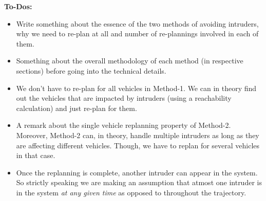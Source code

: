 

\textbf{To-Dos:}
\begin{itemize}
\item Write something about the essence of the two methods of avoiding intruders, why we need to re-plan at all and number of re-plannings involved in each of them.\\
\item Something about the overall methodology of each method (in respective sections) before going into the technical details.\\ 
\item We don't have to re-plan for all vehicles in Method-1. We can in theory find out the vehicles that are impacted by intruders (using a reachability calculation) and just re-plan for them.\\
\item A remark about the single vehicle replanning property of Method-2. Moreover, Method-2 can, in theory, handle multiple intruders as long as they are affecting different vehicles. Though, we have to replan for several vehicles in that case.  \\
\item Once the replanning is complete, another intruder can appear in the system. So strictly speaking we are making an assumption that atmost one intruder is in the system \textit{at any given time} as opposed to throughout the trajectory. \\
\end{itemize}
